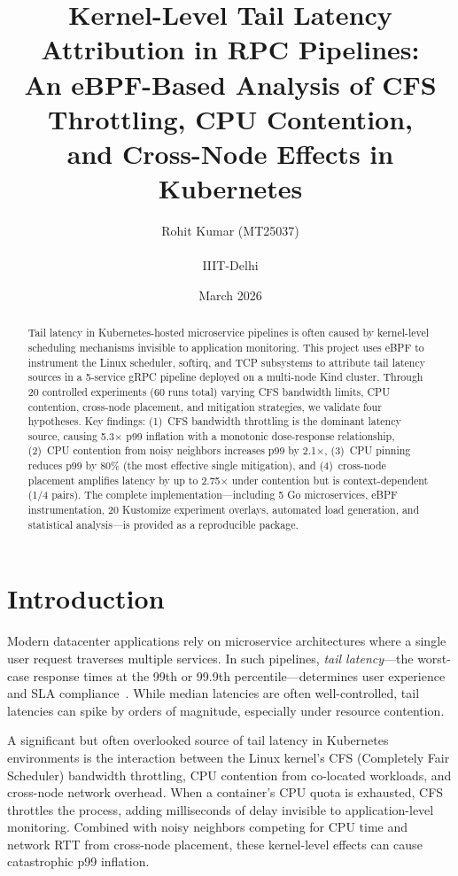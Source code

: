 \documentclass[11pt,a4paper]{article}
\title{
  \textbf{Kernel-Level Tail Latency Attribution in RPC Pipelines:}\\[0.3em]
  \Large An eBPF-Based Analysis of CFS Throttling, CPU Contention,\\and Cross-Node Effects in Kubernetes
}
\author{
  Rohit Kumar (MT25037)\\
  \\
  IIIT-Delhi
}
\date{March 2026}
\begin{document}
\maketitle
\thispagestyle{empty}

\begin{abstract}
Tail latency in Kubernetes-hosted microservice pipelines is often caused by kernel-level scheduling mechanisms invisible to application monitoring. This project uses eBPF to instrument the Linux scheduler, softirq, and TCP subsystems to attribute tail latency sources in a 5-service gRPC pipeline deployed on a multi-node Kind cluster. Through 20 controlled experiments (60 runs total) varying CFS bandwidth limits, CPU contention, cross-node placement, and mitigation strategies, we validate four hypotheses. Key findings: (1)~CFS bandwidth throttling is the dominant latency source, causing 5.3$\times$ p99 inflation with a monotonic dose-response relationship, (2)~CPU contention from noisy neighbors increases p99 by 2.1$\times$, (3)~CPU pinning reduces p99 by 80\% (the most effective single mitigation), and (4)~cross-node placement amplifies latency by up to 2.75$\times$ under contention but is context-dependent (1/4 pairs). The complete implementation---including 5 Go microservices, eBPF instrumentation, 20 Kustomize experiment overlays, automated load generation, and statistical analysis---is provided as a reproducible package.
\end{abstract}

\tableofcontents
\newpage

\section{Introduction}
\label{sec:intro}

Modern datacenter applications rely on microservice architectures where a single user request traverses multiple services. In such pipelines, \emph{tail latency}---the worst-case response times at the 99th or 99.9th percentile---determines user experience and SLA compliance~\cite{dean2013tail}. While median latencies are often well-controlled, tail latencies can spike by orders of magnitude, especially under resource contention.

A significant but often overlooked source of tail latency in Kubernetes environments is the interaction between the Linux kernel's CFS (Completely Fair Scheduler) bandwidth throttling, CPU contention from co-located workloads, and cross-node network overhead. When a container's CPU quota is exhausted, CFS throttles the process, adding milliseconds of delay invisible to application-level monitoring. Combined with noisy neighbors competing for CPU time and network RTT from cross-node placement, these kernel-level effects can cause catastrophic p99 inflation.
\end{document}
